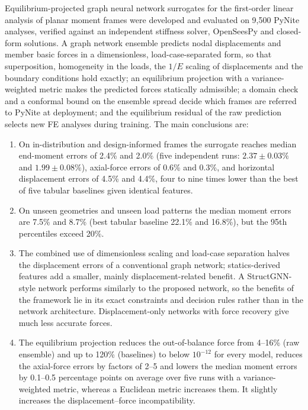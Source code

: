 Equilibrium-projected graph neural network surrogates for the first-order linear analysis of planar moment frames were developed and evaluated on 9{,}500 PyNite analyses, verified against an independent stiffness solver, OpenSeesPy and closed-form solutions. A graph network ensemble predicts nodal displacements and member basic forces in a dimensionless, load-case-separated form, so that superposition, homogeneity in the loads, the $1/E$ scaling of displacements and the boundary conditions hold exactly; an equilibrium projection with a variance-weighted metric makes the predicted forces statically admissible; a domain check and a conformal bound on the ensemble spread decide which frames are referred to PyNite at deployment; and the equilibrium residual of the raw prediction selects new FE analyses during training. The main conclusions are:
\begin{enumerate}
\item On in-distribution and design-informed frames the surrogate reaches median end-moment errors of 2.4\% and 2.0\% (five independent runs: $2.37\pm0.03\%$ and $1.99\pm0.08\%$), axial-force errors of 0.6\% and 0.3\%, and horizontal displacement errors of 4.5\% and 4.4\%, four to nine times lower than the best of five tabular baselines given identical features.
\item On unseen geometries and unseen load patterns the median moment errors are 7.5\% and 8.7\% (best tabular baseline 22.1\% and 16.8\%), but the 95th percentiles exceed 20\%.
\item The combined use of dimensionless scaling and load-case separation halves the displacement errors of a conventional graph network; statics-derived features add a smaller, mainly displacement-related benefit. A StructGNN-style network performs similarly to the proposed network, so the benefits of the framework lie in its exact constraints and decision rules rather than in the network architecture. Displacement-only networks with force recovery give much less accurate forces.
\item The equilibrium projection reduces the out-of-balance force from 4--16\% (raw ensemble) and up to 120\% (baselines) to below $10^{-12}$ for every model, reduces the axial-force errors by factors of 2--5 and lowers the median moment errors by 0.1--0.5 percentage points on average over five runs with a variance-weighted metric, whereas a Euclidean metric increases them. It slightly increases the displacement--force incompatibility.

\end{enumerate}
